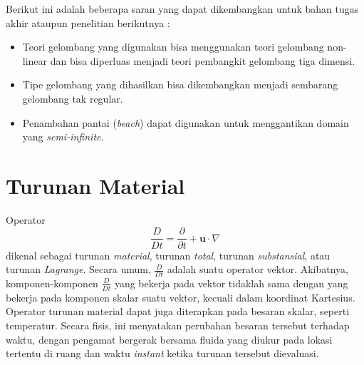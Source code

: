 \documentclass[12pt,a4paper]{report}
\begin{document}
Berikut ini adalah beberapa saran yang dapat dikembangkan untuk bahan tugas
akhir ataupun penelitian berikutnya :

\begin{itemize}
\item[\textbf{a.}]  Teori gelombang yang digunakan bisa menggunakan teori
gelombang non-linear dan bisa diperluas menjadi teori pembangkit gelombang
tiga dimensi.

\item[\textbf{b.}]  Tipe gelombang yang dihasilkan bisa dikembangkan menjadi
sembarang gelombang tak regular.

\item[\textbf{c.}]  Penambahan pantai (\textit{beach}) dapat
digunakan untuk menggantikan domain yang \textit{semi-infinite}.
\end{itemize}


\appendix

\chapter{Turunan Material}

Operator
\begin{equation}
\frac{D}{Dt}=\frac{\partial}{\partial t} + \mathbf{u}\cdot \nabla  \label{op}
\end{equation}
dikenal sebagai turunan \textit{material}, turunan \textit{total},
turunan \textit{substansial}, atau turunan \textit{Lagrange}.
Secara umum, $\displaystyle \frac{D}{Dt}$ adalah suatu operator
vektor. Akibatnya, komponen-komponen $\displaystyle \frac{D}{Dt}$
yang bekerja pada vektor tidaklah sama dengan yang bekerja pada
komponen skalar suatu vektor, kecuali dalam koordinat Kartesius.
Operator turunan material dapat juga diterapkan pada besaran
skalar, seperti temperatur. Secara fisis, ini menyatakan perubahan
besaran tersebut terhadap waktu, dengan pengamat bergerak bersama
fluida yang diukur pada lokasi tertentu di ruang dan waktu
\textit{instant} ketika turunan tersebut dievaluasi.
\end{document}
